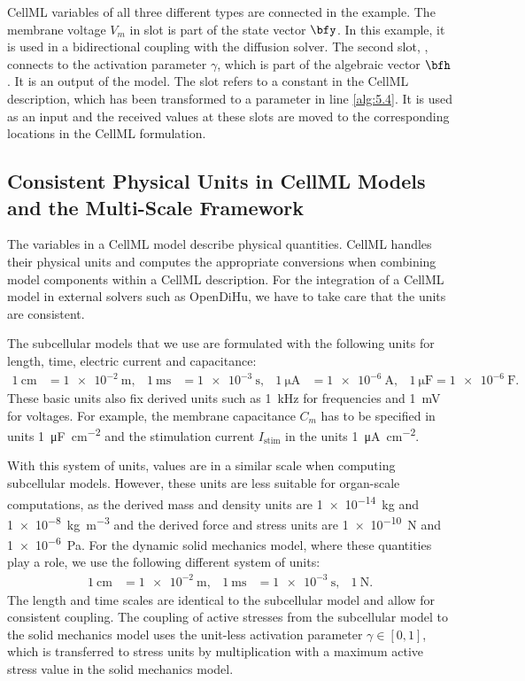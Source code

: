 CellML variables of all three different types are connected in the example. The membrane voltage $V_m$ in slot  is part of the state vector $\bfy$. In this example, it is used in a bidirectional coupling with the diffusion solver. The second slot, , connects to the activation parameter $\gamma$, which is part of the algebraic vector $\bfh$. It is an output of the model. The slot  refers to a constant in the CellML description, which has been transformed to a parameter in line \ref{alg:5.4}. It is used as an  input and the received values at these slots are moved to the corresponding locations in the CellML formulation.


\subsection{Consistent Physical Units in CellML Models and the Multi-Scale Framework}

The variables in a CellML model describe physical quantities. CellML handles their physical units and computes the appropriate conversions when combining model components within a CellML description.
For the integration of a CellML model in external solvers such as OpenDiHu, we have to take care that the units are consistent.

The subcellular models that we use are formulated with the following units for length, time, electric current and capacitance:%
\begin{align*}
   \SI{1}{\centi\meter} &= \SI{1e-2}{\meter}, &
   \SI{1}{\milli\second} &= \SI{1e-3}{\second}, &
   \SI{1}{\micro\ampere} &= \SI{1e-6}{\ampere}, &
   \SI{1}{\micro\farad} = \SI{1e-6}{\farad}.
\end{align*}
These basic units also fix derived units such as \SI{1}{\kilo\hertz} for frequencies and \SI{1}{\milli\volt} for voltages. For example, the membrane capacitance $C_m$ has to be specified in units \SI{1}{\micro\farad\per\square\centi\meter} and the stimulation current $I_\text{stim}$ in the units \SI{1}{\micro\ampere\per\square\centi\meter}.

With this system of units, values are in a similar scale when computing subcellular models. However, these units are less suitable for organ-scale computations, as the derived mass and density units are \SI{1e-14}{\kilogram} and \SI{1e-8}{\kilogram\per\meter\cubed} and the derived force and stress units are \SI{1e-10}{\newton} and \SI{1e-6}{\pascal}. For the dynamic solid mechanics model, where these quantities play a role, we use the following different system of units:
\begin{align*}
   \SI{1}{\centi\meter} &= \SI{1e-2}{\meter}, &
   \SI{1}{\milli\second} &= \SI{1e-3}{\second}, &
   \SI{1}{\newton}.
\end{align*}
The length and time scales are identical to the subcellular model and allow for consistent coupling. The coupling of active stresses from the subcellular model to the solid mechanics model uses the unit-less activation parameter $\gamma \in [0,1]$, which is transferred to stress units by multiplication with a maximum active stress value in the solid mechanics model.

